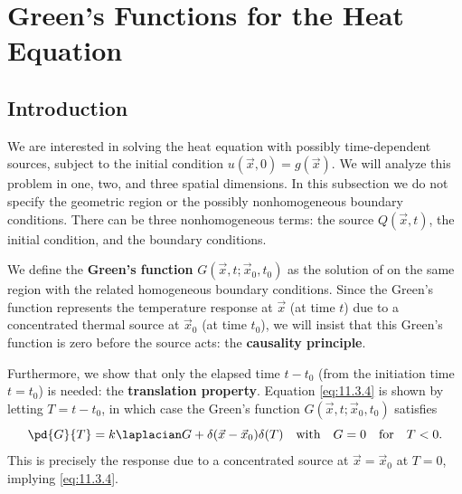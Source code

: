 \section{Green's Functions for the Heat Equation}
\label{sec:greens-heat}

\subsection{Introduction}
\label{subsec:heat-green-intro}

We are interested in solving the heat equation with possibly time-dependent sources,
subject to the initial condition $u(\vec{x},0) = g(\vec{x})$.  We will analyze this problem in one, two, and three spatial dimensions.  In this subsection we do not specify the geometric region or the possibly nonhomogeneous boundary conditions.  There can be three nonhomogeneous terms: the source $Q(\vec{x},t)$, the initial condition, and the boundary conditions.

We define the \textbf{Green's function} $G(\vec{x},t;\vec{x}_0,t_0)$ as the solution of
on the same region with the related homogeneous boundary conditions.  Since the Green's function represents the temperature response at $\vec{x}$ (at time $t$) due to a concentrated thermal source at $\vec{x}_0$ (at time $t_0$), we will insist that this Green's function is zero before the source acts:
the \textbf{causality principle}.

Furthermore, we show that only the elapsed time $t - t_0$ (from the initiation time $t = t_0$) is needed:
the \textbf{translation property}.  Equation \eqref{eq:11.3.4} is shown by letting $T = t - t_0$, in which case the Green's function $G(\vec{x},t;\vec{x}_0,t_0)$ satisfies
\[
\pd{G}{T} = k\laplacian G + \delta(\vec{x} - \vec{x}_0)\delta(T) \quad \text{with} \quad G = 0 \quad \text{for} \quad T < 0.
\]
This is precisely the response due to a concentrated source at $\vec{x} = \vec{x}_0$ at $T = 0$, implying \eqref{eq:11.3.4}.

